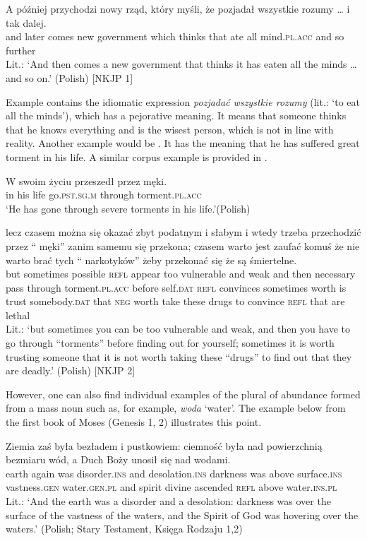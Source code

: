 \documentclass[output=paper,colorlinks,citecolor=brown,
]{langscibook}
\newcommand{\minsp}[1]{#1\hspace{-2pt}} %
\begin{document}
\ea\label{ex:44}	
\gll A później przychodzi nowy rząd, który myśli, że pozjadał wszystkie rozumy {\ldots} i tak dalej. \\
and later comes new government which thinks that ate all mind.\textsc{pl.acc} {} and so further \\ 
\glt Lit.: `And then comes a new government that thinks it has eaten all the minds \ldots and so on.' \hfill (Polish) [NKJP 1]  
\z

\noindent Example  contains the idiomatic expression \textit{pozjadać wszystkie rozumy} (lit.: `to eat all the minds'), which has a pejorative meaning. It means that someone thinks that he knows everything and is the wisest person, which is not in line with reality. Another example would be . It has the meaning that he has suffered great torment in his life. A similar corpus example is provided in .

\ea\label{ex:45}
\gll W swoim życiu przeszedł przez męki.\\
in his life go.\textsc{pst.\textsc{sg.m}} through torment.\textsc{pl.acc} \\   
\glt `He has gone through severe torments in his life.'\hfill (Polish)
\z

\ea\label{ex:46}	
\gll lecz czasem można się okazać zbyt podatnym i słabym i wtedy trzeba przechodzić przez \minsp{``} męki'' zanim samemu się przekona; czasem warto jest zaufać komuś że nie warto brać 	tych \minsp{``} narkotyków'' żeby przekonać się że są śmiertelne. \\
but sometimes possible \textsc{refl} appear too vulnerable and weak and then necessary pass through {} torment.\textsc{pl.acc} before self.\textsc{dat} \textsc{refl} convinces sometimes worth is trust somebody.\textsc{dat} that \textsc{neg} worth take these {} drugs to convince \textsc{refl} that are lethal \\
\glt Lit.: `but sometimes you can be too vulnerable and weak, and then you have to go through ``torments'' before finding out for yourself; sometimes it is worth trusting someone that it is not worth taking these ``drugs'' to find out that they are deadly.' \hfill (Polish) [NKJP 2]  
\z

\noindent However, one can also find individual examples of the plural of abundance formed from a mass noun such as, for example, \textit{woda} `water'. The example below from the first book of Moses (Genesis 1, 2) illustrates this point.

\ea\label{ex:47}	
\gll Ziemia zaś była bezładem i pustkowiem: ciemność była nad powierzchnią bezmiaru wód, a Duch Boży unosił się nad wodami. \\
earth again was disorder.\textsc{ins} and desolation.\textsc{ins} darkness was above surface.\textsc{ins} vastness.\textsc{gen} water.\textsc{gen.pl} and spirit divine ascended \textsc{refl} above water.\textsc{ins.pl} \\ 
\glt Lit.: `And the earth was a disorder and a desolation: darkness was over the surface of the vastness of the waters, and the Spirit of God was hovering over the waters.' \hfill (Polish; Stary Testament, Księga Rodzaju 1,2)  
\z
\end{document}

